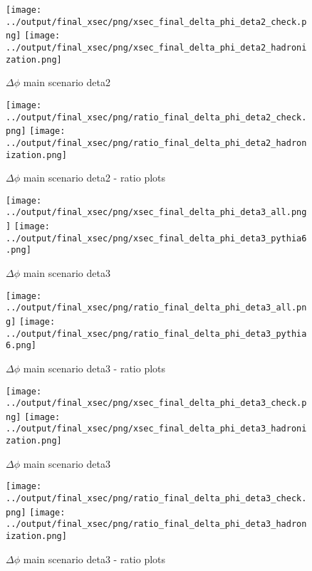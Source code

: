 \documentclass[11pt]{article}
\begin{document}
\begin{figure}[ht]
\centering
\texttt{[image: ../output/final\_xsec/png/xsec\_final\_delta\_phi\_deta2\_check.png]}
\texttt{[image: ../output/final\_xsec/png/xsec\_final\_delta\_phi\_deta2\_hadronization.png]}
\caption{$\Delta\phi$ main scenario deta2}
\label{fig:delta_phi_deta2b}
\end{figure}

\begin{figure}[ht]
\centering
\texttt{[image: ../output/final\_xsec/png/ratio\_final\_delta\_phi\_deta2\_check.png]}
\texttt{[image: ../output/final\_xsec/png/ratio\_final\_delta\_phi\_deta2\_hadronization.png]}
\caption{$\Delta\phi$ main scenario deta2 - ratio plots}
\label{fig:delta_phi_deta2b_ratio}
\end{figure}

\begin{figure}[ht]
\centering
\texttt{[image: ../output/final\_xsec/png/xsec\_final\_delta\_phi\_deta3\_all.png]}
\texttt{[image: ../output/final\_xsec/png/xsec\_final\_delta\_phi\_deta3\_pythia6.png]}
\caption{$\Delta\phi$ main scenario deta3}
\label{fig:delta_phi_deta3}
\end{figure}

\begin{figure}[ht]
\centering
\texttt{[image: ../output/final\_xsec/png/ratio\_final\_delta\_phi\_deta3\_all.png]}
\texttt{[image: ../output/final\_xsec/png/ratio\_final\_delta\_phi\_deta3\_pythia6.png]}
\caption{$\Delta\phi$ main scenario deta3 - ratio plots}
\label{fig:delta_phi_deta3_ratio}
\end{figure}

\begin{figure}[ht]
\centering
\texttt{[image: ../output/final\_xsec/png/xsec\_final\_delta\_phi\_deta3\_check.png]}
\texttt{[image: ../output/final\_xsec/png/xsec\_final\_delta\_phi\_deta3\_hadronization.png]}
\caption{$\Delta\phi$ main scenario deta3}
\label{fig:delta_phi_deta3b}
\end{figure}

\begin{figure}[ht]
\centering
\texttt{[image: ../output/final\_xsec/png/ratio\_final\_delta\_phi\_deta3\_check.png]}
\texttt{[image: ../output/final\_xsec/png/ratio\_final\_delta\_phi\_deta3\_hadronization.png]}
\caption{$\Delta\phi$ main scenario deta3 - ratio plots}
\label{fig:delta_phi_deta3b_ratio}
\end{figure}
\end{document}
